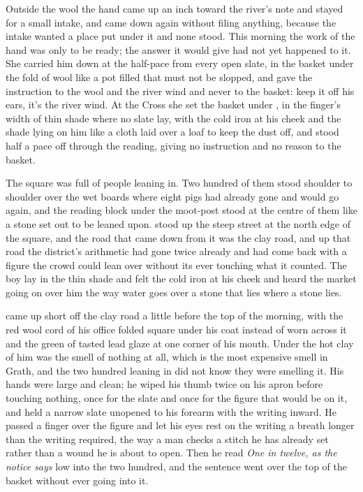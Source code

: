 Outside the wool the hand came up an inch toward the river's note and stayed for a small intake, and came down again without filing anything, because the intake wanted a place put under it and none stood. This morning the work of the hand was only to be ready; the answer it would give had not yet happened to it. She carried him down at the half-pace from every open slate, in the basket under the fold of wool like a pot filled that must not be slopped, and gave the instruction to the wool and the river wind and never to the basket: keep it off his ears, it's the river wind. At the Cross she set the basket under , in the finger's width of thin shade where no slate lay, with the cold iron at his cheek and the shade lying on him like a cloth laid over a loaf to keep the dust off, and stood half a pace off through the reading, giving no instruction and no reason to the basket.

\scenebreak

The square was full of people leaning in. Two hundred of them stood shoulder to shoulder over the wet boards where eight pigs had already gone and would go again, and the reading block under the moot-post stood at the centre of them like a stone set out to be leaned upon.  stood up the steep street at the north edge of the square, and the road that came down from it was the clay road, and up that road the district's arithmetic had gone twice already and had come back with a figure the crowd could lean over without its ever touching what it counted. The boy lay in the thin shade and felt the cold iron at his cheek and heard the market going on over him the way water goes over a stone that lies where a stone lies.

 came up short off the clay road a little before the top of the morning, with the red wool cord of his office folded square under his coat instead of worn across it and the green of tasted lead glaze at one corner of his mouth. Under the hot clay of him was the smell of nothing at all, which is the most expensive smell in Grath, and the two hundred leaning in did not know they were smelling it. His hands were large and clean; he wiped his thumb twice on his apron before touching nothing, once for the slate and once for the figure that would be on it, and held a narrow slate unopened to his forearm with the writing inward. He passed a finger over the figure and let his eyes rest on the writing a breath longer than the writing required, the way a man checks a stitch he has already set rather than a wound he is about to open. Then he read \emph{One in twelve, as the notice says} low into the two hundred, and the sentence went over the top of the basket without ever going into it.

